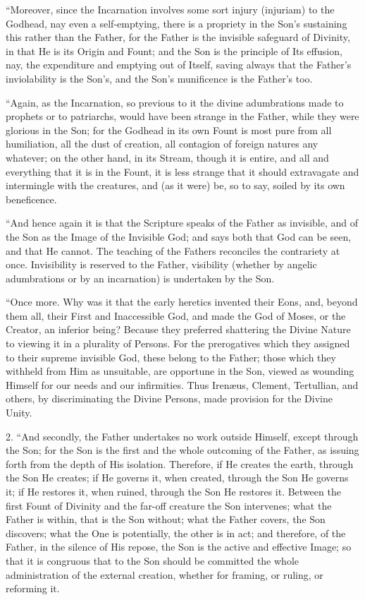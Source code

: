 ``Moreover, since the Incarnation involves some sort injury (injuriam)
to the Godhead, nay even a self-emptying, there is a propriety in the
Son's sustaining this rather than the Father, for the Father is the
invisible safeguard of Divinity, in that He is its Origin and Fount;
and the Son is the principle of Its effusion, nay, the expenditure and
emptying out of Itself, saving always that the Father's inviolability
is the Son's, and the Son's munificence is the Father's too.

``Again, as the Incarnation, so previous to it the divine
adumbrations made to prophets or to patriarchs, would have been
strange in the Father, while they were glorious in the Son; for the
Godhead in its own Fount is most pure from all humiliation, all the
dust of creation, all contagion of foreign natures any whatever; on
the other hand, in its Stream, though it is entire, and all and
everything that it is in the Fount, it is less strange that it should
extravagate and intermingle with the creatures, and (as it were) be,
so to say, soiled by its own beneficence.

``And hence again it is that the Scripture speaks of the Father
as invisible, and of the Son as the Image of the Invisible God; and
says both that God can be seen, and that He cannot. The teaching of
the Fathers reconciles the contrariety at once. Invisibility is
reserved to the Father, visibility (whether by angelic adumbrations or
by an incarnation) is undertaken by the Son.

``Once more. Why was it that the early heretics invented their
Eons, and, beyond them all, their First and Inaccessible God, and made
the God of Moses, or the Creator, an inferior being? Because they
preferred shattering the Divine Nature to viewing it in a
plurality of Persons. For the prerogatives which they assigned to
their supreme invisible God, these belong to the Father; those which
they withheld from Him as unsuitable, are opportune in the Son, viewed
as wounding Himself for our needs and our infirmities. Thus Irenæus,
Clement, Tertullian, and others, by discriminating the Divine Persons,
made provision for the Divine Unity.

2. ``And secondly, the Father undertakes no work outside
Himself, except through the Son; for the Son is the first and the
whole outcoming of the Father, as issuing forth from the depth of His
isolation. Therefore, if He creates the earth, through the Son He
creates; if He governs it, when created, through the Son He governs
it; if He restores it, when ruined, through the Son He restores it.
Between the first Fount of Divinity and the far-off creature the Son
intervenes; what the Father is within, that is the Son without; what
the Father covers, the Son discovers; what the One is potentially, the
other is in act; and therefore, of the Father, in the silence of His
repose, the Son is the active and effective Image; so that it is
congruous that to the Son should be committed the whole administration
of the external creation, whether for framing, or ruling, or reforming
it.

